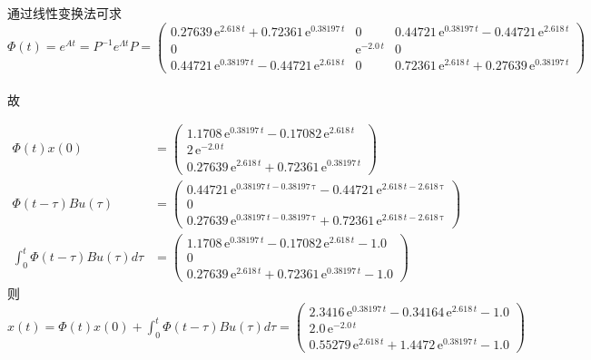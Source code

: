 \documentclass[a4paper]{article}
\begin{document}
通过线性变换法可求 \\
$$ \Phi(t)=
e^{At}=P^{-1}e^{{\Lambda}t}P= \left(\begin{array}{ccc} 0.27639\, \mathrm{e}^{2.618\, t} + 0.72361\, \mathrm{e}^{0.38197\, t} & 0 & 0.44721\, \mathrm{e}^{0.38197\, t} - 0.44721\, \mathrm{e}^{2.618\, t}\\ 0 & \mathrm{e}^{- 2.0\, t} & 0\\ 0.44721\, \mathrm{e}^{0.38197\, t} - 0.44721\, \mathrm{e}^{2.618\, t} & 0 & 0.72361\, \mathrm{e}^{2.618\, t} + 0.27639\, \mathrm{e}^{0.38197\, t} \end{array}\right) $$ \\
\mbox{故 }

\begin{align*}
\Phi(t)x(0) &= \left(\begin{array}{c} 1.1708\, \mathrm{e}^{0.38197\, t} - 0.17082\, \mathrm{e}^{2.618\, t}\\ 2\, \mathrm{e}^{- 2.0\, t}\\ 0.27639\, \mathrm{e}^{2.618\, t} + 0.72361\, \mathrm{e}^{0.38197\, t} \end{array}\right) \\
\Phi(t-\tau)Bu(\tau) &= \left(\begin{array}{c} 0.44721\, \mathrm{e}^{0.38197\, t - 0.38197\, \mathrm{\tau}} - 0.44721\, \mathrm{e}^{2.618\, t - 2.618\, \mathrm{\tau}}\\ 0\\ 0.27639\, \mathrm{e}^{0.38197\, t - 0.38197\, \mathrm{\tau}} + 0.72361\, \mathrm{e}^{2.618\, t - 2.618\, \mathrm{\tau}} \end{array}\right)  \\ 
\int_0^t{\Phi(t-\tau)Bu(\tau)d\tau} &= \left(\begin{array}{c} 1.1708\, \mathrm{e}^{0.38197\, t} - 0.17082\, \mathrm{e}^{2.618\, t} - 1.0\\ 0\\ 0.27639\, \mathrm{e}^{2.618\, t} + 0.72361\, \mathrm{e}^{0.38197\, t} - 1.0 \end{array}\right)
\end{align*}
\mbox{则 }$x(t)=\Phi(t)x(0)+\int_0^t{\Phi(t-\tau)Bu(\tau)d\tau}=\left(\begin{array}{c} 2.3416\, \mathrm{e}^{0.38197\, t} - 0.34164\, \mathrm{e}^{2.618\, t} - 1.0\\ 2.0\, \mathrm{e}^{- 2.0\, t}\\ 0.55279\, \mathrm{e}^{2.618\, t} + 1.4472\, \mathrm{e}^{0.38197\, t} - 1.0 \end{array}\right) $ \\
\end{document}
